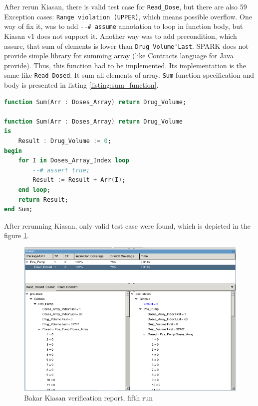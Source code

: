 After rerun Kiasan, there is valid test case for \lstinline{Read_Dose}, but there are also 59 Exception cases: \lstinline{Range violation (UPPER)}, which means possible overflow. One way of fix it, was to add \lstinline{--# assume} annotation to loop in function body, but Kiasan v1 does not support it. Another way was to add precondition, which assure, that sum of elements is lower than \lstinline{Drug_Volume'Last}. SPARK does not provide simple library for summing array (like Contracts language for Java provide). Thus, this function had to be implemented. Its implementation is the same like \lstinline{Read_Dosed}. It sum all elements of array. \lstinline{Sum} function specification and body is presented in listing \ref{listing:sum_function}.

\singlespacing
\begin{lstlisting}[language=ada, frame=single, gobble=0, caption={Sum function for summing all elements of array}, label={listing:sum_function}]
function Sum(Arr : Doses_Array) return Drug_Volume;

function Sum(Arr : Doses_Array) return Drug_Volume
is
    Result : Drug_Volume := 0;
begin
    for I in Doses_Array_Index loop
        --# assert true;
        Result := Result + Arr(I);
    end loop;
    return Result;
end Sum;
\end{lstlisting}
\doublespacing

After rerunning Kiasan, only valid test case were found, which is depicted in the figure \ref{figure:sparkverification:kiasanreport5}.

\begin{figure}[ht]%
    \begin{center}
        \includegraphics[width=1.0\textwidth]{figures/pca-pump-verification-step5.png}
        \caption{Bakar Kiasan verification report, fifth run}
    \end{center}
    \label{figure:sparkverification:kiasanreport5}
\end{figure}

